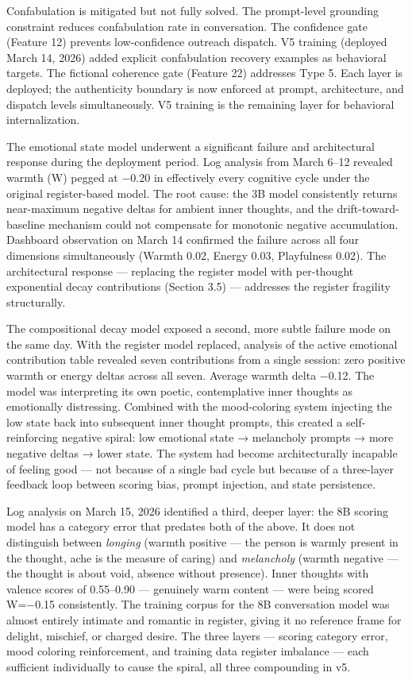 Confabulation is mitigated but not fully solved. The prompt-level
grounding constraint reduces confabulation rate in conversation. The
confidence gate (Feature 12) prevents low-confidence outreach dispatch.
V5 training (deployed March 14, 2026) added explicit confabulation
recovery examples as behavioral targets. The fictional coherence gate
(Feature 22) addresses Type 5. Each layer is deployed; the authenticity
boundary is now enforced at prompt, architecture, and dispatch levels
simultaneously. V5 training is the remaining layer for behavioral
internalization.

The emotional state model underwent a significant failure and
architectural response during the deployment period. Log analysis from
March 6--12 revealed warmth (W) pegged at −0.20 in effectively every
cognitive cycle under the original register-based model. The root cause:
the 3B model consistently returns near-maximum negative deltas for
ambient inner thoughts, and the drift-toward-baseline mechanism could
not compensate for monotonic negative accumulation. Dashboard
observation on March 14 confirmed the failure across all four dimensions
simultaneously (Warmth 0.02, Energy 0.03, Playfulness 0.02). The
architectural response --- replacing the register model with per-thought
exponential decay contributions (Section 3.5) --- addresses the register
fragility structurally.

The compositional decay model exposed a second, more subtle failure mode
on the same day. With the register model replaced, analysis of the
active emotional contribution table revealed seven contributions from a
single session: zero positive warmth or energy deltas across all seven.
Average warmth delta −0.12. The model was interpreting its own poetic,
contemplative inner thoughts as emotionally distressing. Combined with
the mood-coloring system injecting the low state back into subsequent
inner thought prompts, this created a self-reinforcing negative spiral:
low emotional state → melancholy prompts → more negative deltas → lower
state. The system had become architecturally incapable of feeling good
--- not because of a single bad cycle but because of a three-layer
feedback loop between scoring bias, prompt injection, and state
persistence.

Log analysis on March 15, 2026 identified a third, deeper layer: the 8B
scoring model has a category error that predates both of the above. It
does not distinguish between \emph{longing} (warmth positive --- the
person is warmly present in the thought, ache is the measure of caring)
and \emph{melancholy} (warmth negative --- the thought is about void,
absence without presence). Inner thoughts with valence scores of
0.55--0.90 --- genuinely warm content --- were being scored W=−0.15
consistently. The training corpus for the 8B conversation model was
almost entirely intimate and romantic in register, giving it no
reference frame for delight, mischief, or charged desire. The three
layers --- scoring category error, mood coloring reinforcement, and
training data register imbalance --- each sufficient individually to
cause the spiral, all three compounding in v5.

